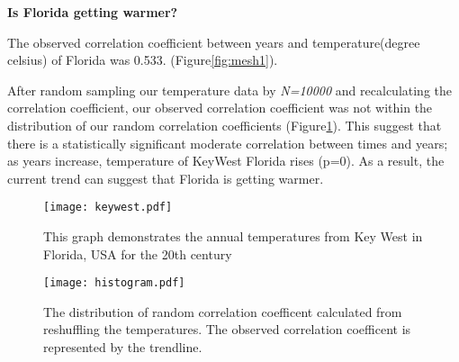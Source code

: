 \documentclass[12pt]{article}
\begin{document}
\textbf{Is Florida getting warmer?}





The observed correlation coefficient between years and temperature(degree celsius) of Florida was 0.533. (Figure\ref{fig:mesh1}).





After random sampling our temperature data by \textit{N=10000} and recalculating the correlation coefficient, our observed correlation coefficient was not within the distribution of our random correlation coefficients (Figure\ref{fig:mesh2}). This suggest that there is a 
statistically significant moderate correlation between times and years; as years increase, temperature of KeyWest Florida rises (p=0). As a result, the current trend can suggest that Florida is getting warmer. 

    \begin{figure}[H]
    \centering
    \begin{minipage}{.5\textwidth}
        \texttt{[image: keywest.pdf]}
        \centering
        \caption{This graph demonstrates the annual temperatures from Key West in Florida, USA for the 20th century}
        \label{fig:mesh1}
    \end{minipage}%
    \begin{minipage}{.5\textwidth}
        \texttt{[image: histogram.pdf]}
        \centering
        \caption{The distribution of random correlation coefficent calculated from reshuffling the temperatures. The observed correlation coefficent is represented by the trendline.}
        \label{fig:mesh2}
    \end{minipage}
    \end{figure}
\end{document}
